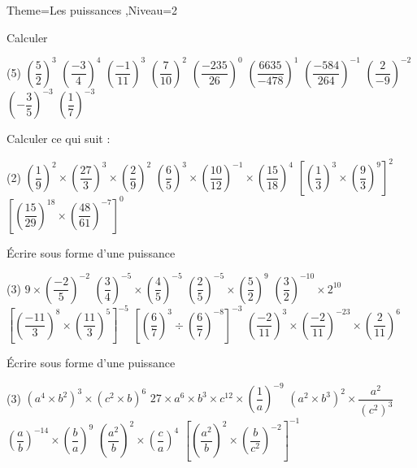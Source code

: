 \documentclass[a4paper,12pt]{article}
\begin{document}
\begin{Maquette}[Fiche]{Theme=Les puissances ,Niveau=2}

\begin{exercice}
Calculer 
\begin{tasks}(5)
\task $\left(\dfrac{5}{2} \right)^{3} $
\task $\left( \dfrac{-3}{4}\right)^{4} $
\task $\left(\dfrac{-1}{11} \right)^{3} $
\task $\left( \dfrac{7}{10}\right)^{2} $
\task $\left(\dfrac{-235}{26} \right)^{0} $
\task $\left( \dfrac{6635}{-478}\right)^{1} $
\task $\left(\dfrac{-584}{264} \right)^{-1} $
\task $\left( \dfrac{2}{-9}\right)^{-2} $
\task $\left(-\dfrac{3}{5} \right)^{-3} $
\task $\left(\dfrac{1}{7} \right)^{-3} $
\end{tasks}
\end{exercice}

\begin{exercice}
Calculer ce qui suit :
\begin{tasks}(2)
\task $\left( \dfrac{1}{9}\right)^{2}\times\left( \dfrac{27}{3}\right)^{3}\times\left( \dfrac{2}{9}\right)^{2}$
\task $\left(\dfrac{6}{5} \right)^{3}\times\left( \dfrac{10}{12}\right)^{-1}\times\left( \dfrac{15}{18}\right)^{4}$
\task $\left[\left(\dfrac{1}{3} \right)^{3}\times\left(\dfrac{9}{3} \right)^{9} \right]^{2}$
\task $\left[\left( \dfrac{15}{29}\right)^{18} \times\left(\dfrac{48}{61} \right)^{-7}\right]^{0}$
\end{tasks}
\end{exercice}

\begin{exercice}
\'Ecrire sous forme d'une puissance
\begin{tasks}(3)
\task $9\times\left(\dfrac{-2}{5} \right)^{-2}$
\task $\left(\dfrac{3}{4} \right)^{-5}\times\left( \dfrac{4}{5}\right)^{-5}$
\task $\left( \dfrac{2}{5}\right)^{-5}\times\left( \dfrac{5}{2}\right)^{9}$
\task $\left(\dfrac{3}{2} \right)^{-10}\times 2^{10}$
\task $\left[ \left(\dfrac{-11}{3} \right)^{8}\times\left(\dfrac{11}{3} \right)^{5}\right]^{-5}$
\task $\left[\left( \dfrac{6}{7}\right)^{3}\div\left(\dfrac{6}{7} \right)^{-8} \right]^{-3}$
\task* $ \left(\dfrac{-2}{11} \right)^{3}\times\left(\dfrac{-2}{11} \right)^{-23}\times\left(\dfrac{2}{11} \right)^{6}$
\end{tasks}
\end{exercice}

\begin{exercice}
\'Ecrire sous forme d'une puissance
\begin{tasks}(3)
\task $(a^{4}\times b^{2})^{3}\times (c^{2}\times b)^{6}$
\task $27\times a^{6}\times b^{3}\times c^{12}\times\left(\dfrac{1}{a}\right)^{-9}$
\task $(a^{2}\times b^{3})^{2}\times \dfrac{a^{2}}{(c^{2})^{3}}$ 
\task $\left(\dfrac{a}{b} \right)^{-14}\times \left( \dfrac{b}{a}\right)^{9}$
\task $\left( \dfrac{a^{2}}{b}\right)^{2}\times\left(\dfrac{c}{a} \right)^{4}$
\task $\left[\left(\dfrac{a^{2}}{b} \right)^{2}\times\left(\dfrac{b}{c^{2}} \right)^{-2}\right]^{-1}$
\end{tasks}
\end{exercice}


\end{Maquette}
\end{document}
